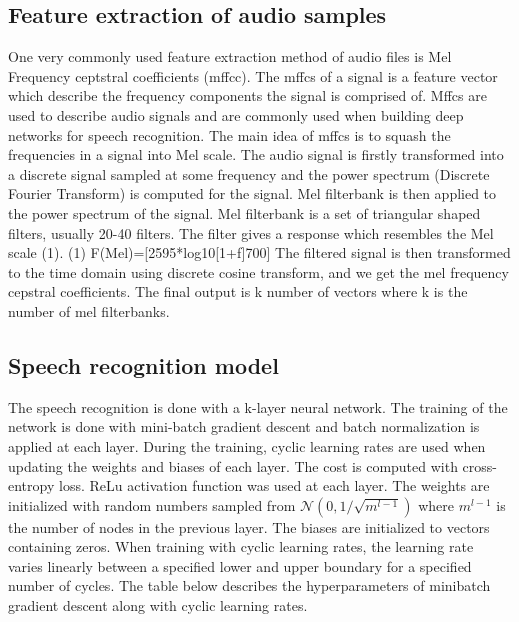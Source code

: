 \documentclass[../main.tex]{subfiles}
\begin{document}
\subsection{Feature extraction of audio samples}
One very commonly used feature extraction method of audio files is Mel Frequency ceptstral coefficients (mffcc). The mffcs of a signal is a feature vector which describe the frequency components the signal is comprised of. Mffcs are used to describe audio signals and are commonly used when building deep networks for speech recognition. The main idea of mffcs is to squash the frequencies in a signal into Mel scale. The audio signal is firstly transformed into a discrete signal sampled at some frequency and the power spectrum (Discrete Fourier Transform) is computed for the signal. Mel filterbank is then applied to the power spectrum of the signal. Mel filterbank is a set of triangular shaped filters, usually 20-40 filters. The filter gives a response which resembles the Mel scale (1).
(1) F(Mel)=[2595*log10[1+f]700] 
The filtered signal is then transformed to the time domain using discrete cosine transform, and we get the mel frequency cepstral coefficients. The final output is k number of vectors where k is the number of mel filterbanks.\cite{martinez2012speaker}
\subsection{Speech recognition model}
The speech recognition is done with a k-layer neural network. The training of the network is done with mini-batch gradient descent and batch normalization is applied at each layer. During the training, cyclic learning rates \cite{cyclic} are used when updating the weights and biases of each layer. The cost is computed with cross-entropy loss. ReLu activation function was used at each layer. The weights are initialized with random numbers sampled from $\mathcal{N}(0,1/\sqrt{m^{l-1}})$ where $m^{l-1}$ is the number of nodes in the previous layer. The biases are initialized to vectors containing zeros. When training with cyclic learning rates, the learning rate varies linearly between a specified lower and upper boundary for a specified number of cycles. The table below describes the hyperparameters of minibatch gradient descent along with cyclic learning rates.
\end{document}
